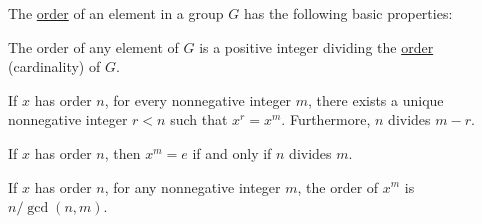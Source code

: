 \begin{proposition}\label{thm:def:group_element_order}
  The \hyperref[def:group_element_order]{order} of an element in a  group \( G \) has the following basic properties:

  \begin{thmenum}
     The order of any element of \( G \) is a positive integer dividing the \hyperref[def:group_order]{order} (cardinality) of \( G \).

     If \( x \) has order \( n \), for every nonnegative integer \( m \), there exists a unique nonnegative integer \( r < n \) such that \( x^r = x^m \). Furthermore, \( n \) divides \( m - r \).

     If \( x \) has order \( n \), then \( x^m = e \) if and only if \( n \) divides \( m \).

     If \( x \) has order \( n \), for any nonnegative integer \( m \), the order of \( x^m \) is \( n / \gcd(n, m) \).
  \end{thmenum}
\end{proposition}
